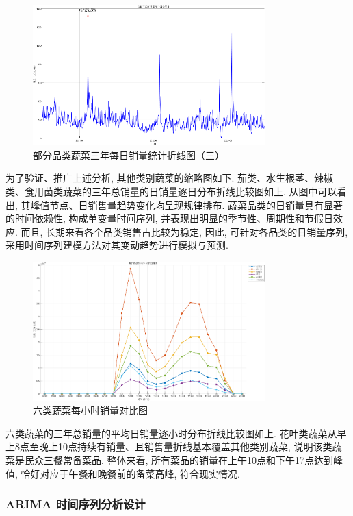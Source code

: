 \documentclass{MathNoteCN}
\begin{document}
\begin{figure}[H]
    \centering
    \includegraphics[width=0.8\textwidth]{其他品类日销量折线图3.png} 
    \caption{部分品类蔬菜三年每日销量统计折线图（三）}
\end{figure}

为了验证、推广上述分析, 其他类别蔬菜的缩略图如下. 茄类、水生根茎、辣椒类、食用菌类蔬菜的三年总销量的日销量逐日分布折线比较图如上. 从图中可以看出, 其峰值节点、日销售量趋势变化均呈现规律排布. 蔬菜品类的日销量具有显著的时间依赖性, 构成单变量时间序列, 并表现出明显的季节性、周期性和节假日效应. 而且, 长期来看各个品类销售占比较为稳定, 因此, 可针对各品类的日销量序列, 采用时间序列建模方法对其变动趋势进行模拟与预测.

\begin{figure}[H]
    \centering
    \includegraphics[width=0.8\textwidth]{6个数据集每小时销量对比.png} 
    \caption{六类蔬菜每小时销量对比图}
\end{figure}

六类蔬菜的三年总销量的平均日销量逐小时分布折线比较图如上. 花叶类蔬菜从早上8点至晚上10点持续有销量、且销售量折线基本覆盖其他类别蔬菜, 说明该类蔬菜是民众三餐常备菜品. 整体来看, 所有菜品的销量在上午10点和下午17点达到峰值, 恰好对应于午餐和晚餐前的备菜高峰, 符合现实情况.

\subsubsection{ARIMA 时间序列分析设计}
\end{document}
